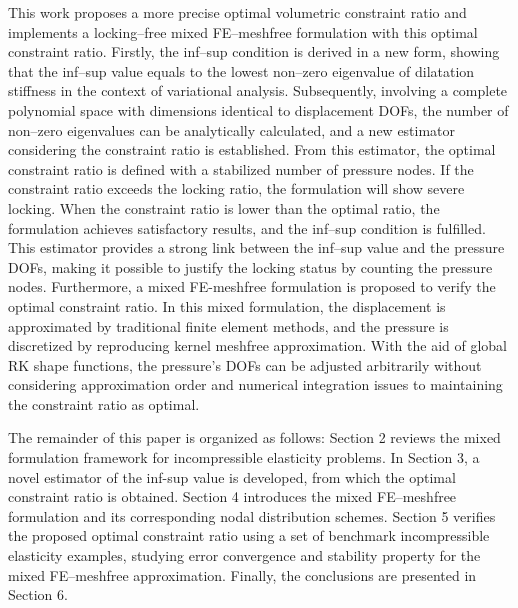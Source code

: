 This work proposes a more precise optimal volumetric constraint ratio and implements a locking--free mixed FE--meshfree formulation with this optimal constraint ratio.
Firstly, the inf--sup condition is derived in a new form, showing that the inf--sup value equals to the lowest non--zero eigenvalue of dilatation stiffness in the context of variational analysis.
Subsequently, involving a complete polynomial space with dimensions identical to displacement DOFs, the number of non--zero eigenvalues can be analytically calculated,
and a new estimator considering the constraint ratio is established.
From this estimator, the optimal constraint ratio is defined with a stabilized number of pressure nodes.
If the constraint ratio exceeds the locking ratio, the formulation will show severe locking.
When the constraint ratio is lower than the optimal ratio, the formulation achieves satisfactory results, and the inf--sup condition is fulfilled.
This estimator provides a strong link between the inf--sup value and the pressure DOFs, making it possible to justify the locking status by counting the pressure nodes.
Furthermore, a mixed FE-meshfree formulation is proposed to verify the optimal constraint ratio.
In this mixed formulation, the displacement is approximated by traditional finite element methods, and the pressure is discretized by reproducing kernel meshfree approximation.
With the aid of global RK shape functions, the pressure's DOFs can be adjusted arbitrarily without considering approximation order and numerical integration issues to maintaining the constraint ratio as optimal.

The remainder of this paper is organized as follows:
Section 2 reviews the mixed formulation framework for incompressible elasticity problems.
In Section 3, a novel estimator of the inf-sup value is developed, from which the optimal constraint ratio is obtained.
Section 4 introduces the mixed FE--meshfree formulation and its corresponding nodal distribution schemes.
Section 5 verifies the proposed optimal constraint ratio using a set of benchmark incompressible elasticity examples, studying error convergence and stability property for the mixed FE--meshfree approximation. Finally, the conclusions are presented in Section 6.
